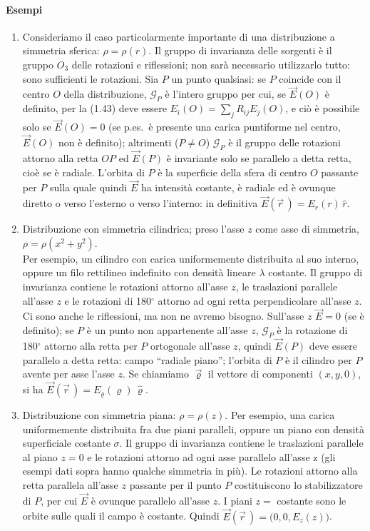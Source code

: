 \paragraph{Esempi}
\begin{enumerate}
  \item Consideriamo il caso particolarmente importante di una distribuzione a
    simmetria sferica: $\rho=\rho(r)$. Il gruppo di invarianza delle sorgenti
    \`e il gruppo $O_3$ delle rotazioni e riflessioni; non sar\`a necessario
    utilizzarlo tutto: sono sufficienti le rotazioni. Sia $P$ un punto
    qualsiasi: se $P$ coincide con il centro $O$ della distribuzione,
    $\mathcal G_P$ \`e l'intero gruppo per cui, se $\vec E(O)$ \`e definito, per
    la (1.43) deve essere $E_i(O)=\sum_jR_{ij}E_j(O)$, e ci\`o \`e possibile
    solo se $\vec E(O)=0$ (se p.es.\ \`e presente una carica puntiforme nel
    centro, $\vec E(O)$ non \`e definito); altrimenti ($P\neq O$) $\mathcal G_P$
    \`e il gruppo delle rotazioni attorno alla retta $OP$ ed $\vec E(P)$ \`e
    invariante solo se parallelo a detta retta, cio\`e se \`e radiale. L'orbita
    di $P$ \`e la superficie della sfera di centro $O$
    passante per $P$ sulla quale quindi $\vec E$ ha intensit\`a costante, \`e
    radiale ed \`e ovunque diretto o verso l'esterno o verso l'interno: in
    definitiva $\vec E(\vec r\,)=E_r(r)\,\hat r$.
  \item Distribuzione con simmetria cilindrica; preso l'asse $z$ come asse di
    simmetria, $\rho=\rho(x^2+y^2)$.\\
    Per esempio, un cilindro con carica uniformemente distribuita al suo
    interno, oppure un filo rettilineo indefinito con densit\`a lineare
    $\lambda$ costante. Il gruppo di invarianza contiene le rotazioni attorno
    all'asse $z$, le traslazioni parallele all'asse $z$ e le rotazioni di
    180$^\circ$ attorno ad ogni retta perpendicolare all'asse $z$. Ci sono anche
    le riflessioni, ma non ne avremo bisogno. Sull'asse $z$ $\vec E=0$ (se \`e
    definito); se $P$ \`e un punto non appartenente all'asse $z$, $\mathcal G_P$
    \`e la rotazione di 180$^\circ$ attorno alla retta per $P$ ortogonale
    all'asse $z$, quindi $\vec E(P)$ deve essere parallelo a detta retta: campo
    ``radiale piano''; l'orbita di $P$ \`e il cilindro per $P$ avente per asse
    l'asse $z$. Se chiamiamo $\vec\varrho$ il vettore di componenti $(x,y,0)$,
    si ha $\vec E(\vec r\,)=E_\varrho(\varrho)\,\hat\varrho$.
  \item Distribuzione con simmetria piana: $\rho=\rho(z)$. Per esempio, una
    carica uniformemente distribuita fra due piani paralleli, oppure un piano
    con densit\`a superficiale costante $\sigma$. Il gruppo di invarianza
    contiene le traslazioni parallele al piano $z=0$ e le rotazioni attorno ad
    ogni asse parallelo all'asse z (gli esempi dati sopra hanno qualche
    simmetria in pi\`u). Le rotazioni attorno alla retta parallela all'asse $z$
    passante per il punto $P$ costituiscono lo stabilizzatore di $P$, per cui
    $\vec E$ \`e ovunque parallelo all'asse $z$. I piani $z=$ costante sono le
    orbite sulle quali il campo \`e costante. Quindi
    $\vec E(\vec r\,)=\big(0,0,E_z(z)\big)$.
\end{enumerate}
